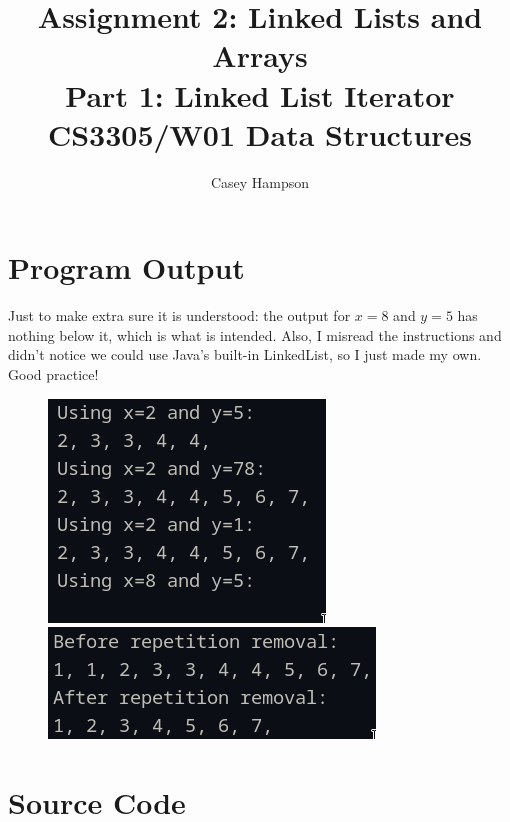 \documentclass{article}
\title{Assignment 2: Linked Lists and Arrays \\[5pt] Part 1: Linked List Iterator \\[8pt] CS3305/W01 Data Structures}
\author{Casey Hampson}
\begin{document}
\maketitle



\section*{Program Output}
    Just to make extra sure it is understood: the output for $x=8$ and $y=5$ has nothing below it, which is what is intended. Also, I misread the instructions and didn't notice we could use Java's built-in LinkedList, so I just made my own. Good practice!

    \begin{figure}[htbp]
        \centering
        \includegraphics[scale=0.8]{./res/1.png}
        \includegraphics[scale=0.8]{./res/2.png}
    \end{figure}

\pagebreak
\section*{Source Code}
\inputminted{java}{./P1.java}
\end{document}
